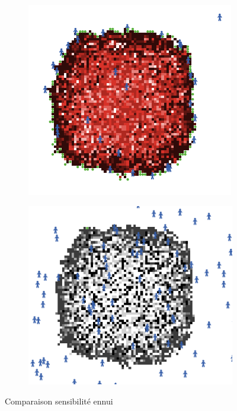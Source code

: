\documentclass{article}
\begin{document}
\begin{figure}[H]
\begin{subfigure}{.5\textwidth}
    \includegraphics[width=.8\linewidth]{pictures/sensibilite_fort_ennui_complexite.png}
  \end{subfigure}
  \begin{subfigure}{.5\textwidth}
    \centering
    \includegraphics[width=.8\linewidth]{pictures/sensibilite_fort_ennui_sante.png}
  \end{subfigure}

  \caption{Comparaison sensibilité ennui}
\end{figure}
\end{document}

